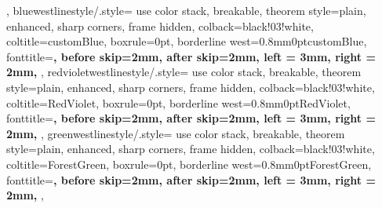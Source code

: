 {{  }, 
  bluewestlinestyle/.style={
    use color stack, 
	breakable,
	theorem style=plain,
	enhanced,
	sharp corners,
	frame hidden,
	colback=black!03!white,
	coltitle=customBlue,
	boxrule=0pt,
	borderline west={0.8mm}{0pt}{customBlue},
	fonttitle=\upshape\bfseries\hypersetup{citecolor=customBlue,linkcolor=customBlue},
	before skip=2mm,
	after skip=2mm,
	left = 3mm, 
	right = 2mm, 
  },
  redvioletwestlinestyle/.style={
    use color stack, 
	breakable,
	theorem style=plain,
	enhanced,
	sharp corners,
	frame hidden,
	colback=black!03!white,
	coltitle=RedViolet,
	boxrule=0pt,
	borderline west={0.8mm}{0pt}{RedViolet},
	fonttitle=\upshape\bfseries\hypersetup{citecolor=RedViolet,linkcolor=RedViolet},
	before skip=2mm,
	after skip=2mm,
	left = 3mm, 
	right = 2mm, 
  },
  greenwestlinestyle/.style={
    use color stack, 
	breakable,
	theorem style=plain,
	enhanced,
	sharp corners,
	frame hidden,
	colback=black!03!white,
	coltitle=ForestGreen,
	boxrule=0pt,
	borderline west={0.8mm}{0pt}{ForestGreen},
	fonttitle=\upshape\bfseries\hypersetup{citecolor=ForestGreen,linkcolor=ForestGreen},
	before skip=2mm,
	after skip=2mm,
	left = 3mm, 
	right = 2mm, 
  },
}




\makeatletter
\def\@LN@depthbox{%
  \ifdim\@tempdima = -1000pt
  \else
    \dp\@tempboxa=\@tempdima
    \nointerlineskip \kern-\@tempdima 
  \fi
  \box\@tempboxa
  } 
\makeatother


